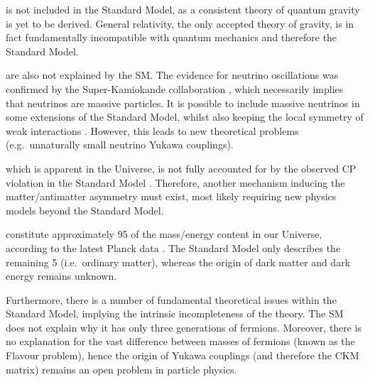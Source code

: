 \begin{description}[wide=\parindent]
\item [Gravity] is not included in the Standard Model, as a consistent theory of quantum gravity is yet to be derived.
General relativity, the only accepted theory of gravity, is in fact fundamentally incompatible with quantum mechanics
and therefore the Standard Model.
\item [Massive neutrinos] are also not explained by the SM. The evidence for neutrino oscillations was confirmed by the
Super-Kamiokande collaboration \autocite{neutrino_oscillations}, which necessarily implies that neutrinos are massive
particles. It is possible to include massive neutrinos in some extensions of the Standard Model, whilst also keeping the
local symmetry of weak interactions \autocite{Shaposhnikov_nuMSM}. However, this leads to new theoretical problems
(e.g.\ unnaturally small neutrino Yukawa couplings).
\item [Matter/antimatter asymmetry,] which is apparent in the Universe, is not fully accounted for by the observed CP
violation in the Standard Model \autocite{Peskin_matter_antimatter, matter_antimatter_asymmetry}. Therefore, another
mechanism inducing the matter/antimatter asymmetry must exist, most likely requiring new physics models beyond the
Standard Model.

\item [Dark matter and dark energy] constitute approximately \SI{95}{\pc} of the mass/energy content in our Universe,
according to the latest Planck data \autocite{planck2013-p01, planck2013-p11}. The Standard Model only describes the
remaining \SI{5}{\pc} (i.e.\ ordinary matter), whereas the origin of dark matter and dark energy remains unknown.
\end{description}

Furthermore, there is a number of fundamental theoretical issues within the Standard Model, implying the intrinsic
incompleteness of the theory. The SM does not explain why it has only three generations of fermions. Moreover, there is
no explanation for the vast difference between masses of fermions (known as the Flavour problem), hence the origin of
Yukawa couplings (and therefore the CKM matrix) remains an open problem in particle physics.

